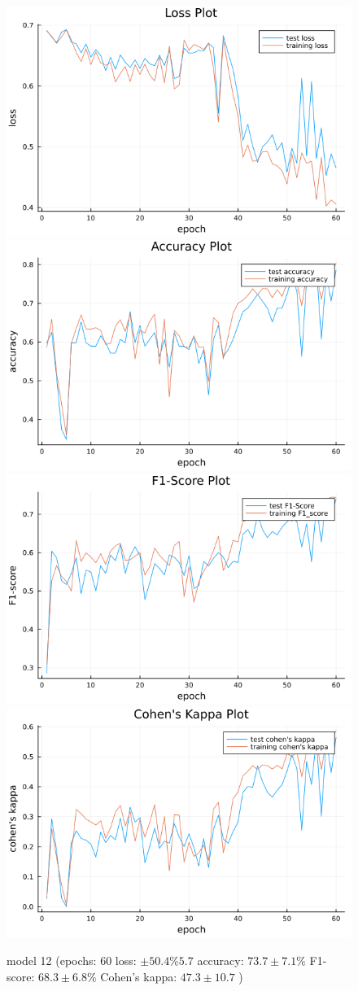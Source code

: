 \documentclass[
a4paper, 
12pt,
grayscalebody, %
abstract=on,
twoside, BCOR10mm, 12pt, DIV13,headinclude, footexclude, final, abstracton, openright
]{ibireprt}
\numberwithin{equation}{chapter}
\numberwithin{table}{chapter}
\numberwithin{figure}{chapter}
\numberwithin{algorithm}{chapter}
\numberwithin{example}{chapter}
\numberwithin{example}{chapter}
\begin{document}
\begin{figure}[h]
	\includegraphics[width=0.4\linewidth]{loss_png_12_1.png}\hfill
	\includegraphics[width=0.4\linewidth]{accuracy_png_12_1.png}
	\\[\smallskipamount]
	\includegraphics[width=0.4\linewidth]{f1_score_png_12_1.png}\hfill
	\includegraphics[width=0.4\linewidth]{cohens_kappa_png_12_1.png}
	\caption{model 12 (epochs: 60 loss: $\pm50.4\%5.7 $ accuracy: $73.7\pm7.1\%$ F1-score: $68.3\pm6.8\%$  Cohen's kappa: $47.3\pm10.7$ )}%
\end{figure}
\end{document}
